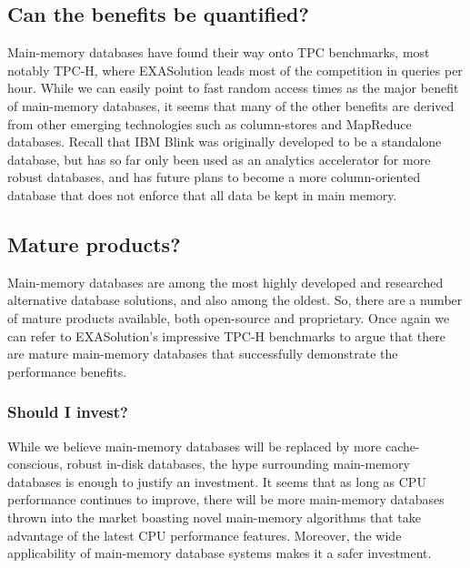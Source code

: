 \documentclass[11pt,a4paper]{report}
\begin{document}
\subsection{Can the benefits be quantified?}
Main-memory databases have found their way onto TPC benchmarks, most notably TPC-H, where EXASolution leads most of the competition in queries per hour. \cite{tpchbm} While we can easily point to fast random access times as the major benefit of main-memory databases, it seems that many of the other benefits are derived from other emerging technologies such as column-stores and MapReduce databases. Recall that IBM Blink was originally developed to be a standalone database, but has so far only been used as an analytics accelerator for more robust databases, and has future plans to become a more column-oriented database that does not enforce that all data be kept in main memory.\cite{inablink}

\subsection{Mature products?}
Main-memory databases are among the most highly developed and researched alternative database solutions, and also among the oldest. So, there are a number of mature products available, both open-source and proprietary. Once again we can refer to EXASolution's impressive TPC-H benchmarks to argue that there are mature main-memory databases that successfully demonstrate the performance benefits.\cite{tpchbm}

\subsubsection{Should I invest?}
While we believe main-memory databases will be replaced by more cache-conscious, robust in-disk databases, the hype surrounding main-memory databases is enough to justify an investment. It seems that as long as CPU performance continues to improve, there will be more main-memory databases thrown into the market boasting novel main-memory algorithms that take advantage of the latest CPU performance features. Moreover, the wide applicability of main-memory database systems makes it a safer investment.
\end{document}
